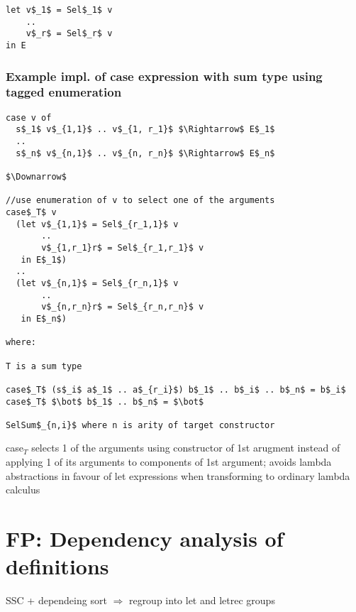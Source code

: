 \documentclass[8pt]{extarticle}
\begin{document}
\begin{multicols*}{2}
\begin{lstlisting}
let v$_1$ = Sel$_1$ v
    ..
    v$_r$ = Sel$_r$ v
in E
\end{lstlisting}

\subsubsection{Example impl. of case expression with sum type using tagged enumeration}

\begin{lstlisting}
case v of
  s$_1$ v$_{1,1}$ .. v$_{1, r_1}$ $\Rightarrow$ E$_1$
  ..
  s$_n$ v$_{n,1}$ .. v$_{n, r_n}$ $\Rightarrow$ E$_n$

$\Downarrow$

//use enumeration of v to select one of the arguments
case$_T$ v 
  (let v$_{1,1}$ = Sel$_{r_1,1}$ v
       ..
       v$_{1,r_1}r$ = Sel$_{r_1,r_1}$ v
   in E$_1$)
  ..
  (let v$_{n,1}$ = Sel$_{r_n,1}$ v
       ..
       v$_{n,r_n}r$ = Sel$_{r_n,r_n}$ v
   in E$_n$)

where:

T is a sum type

case$_T$ (s$_i$ a$_1$ .. a$_{r_i}$) b$_1$ .. b$_i$ .. b$_n$ = b$_i$
case$_T$ $\bot$ b$_1$ .. b$_n$ = $\bot$

SelSum$_{n,i}$ where n is arity of target constructor

\end{lstlisting}

case$_T$ selects 1 of the arguments using constructor of 1st arugment instead of applying 1 of its arguments to components of 1st argument; avoids lambda abstractions in favour of let expressions when transforming to ordinary lambda calculus

\vfill\null
\columnbreak

\section{FP: Dependency analysis of definitions}

SSC + dependeing sort $\Rightarrow$ regroup into let and letrec groups


\end{multicols*}
\end{document}
